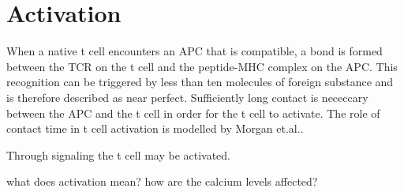\section{Activation}

When a native t cell encounters an APC that is compatible, a bond is formed between the TCR on the t cell and the peptide-MHC complex on the APC. This recognition can be triggered by less than ten molecules of foreign substance and is therefore described as near perfect. Sufficiently long contact is nececcary between the APC and the t cell in order for the t cell to activate. The role of contact time in t cell activation is modelled by Morgan et.al.\cite{morgan2023}.

Through \Calcium signaling the t cell may be activated.

what does activation mean? how are the calcium levels affected?